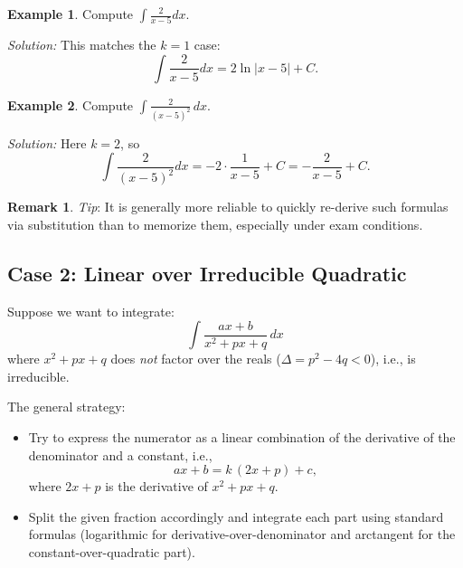 \documentclass[11pt]{article}
\theoremstyle{definition}
\newtheorem{examplex}{Example}[section]
\newtheorem*{remark}{Remark}
\theoremstyle{plain}
\begin{document}
\begin{examplex}
    Compute $\displaystyle \int \frac{2}{x-5} dx$.
    
    \emph{Solution:} This matches the \( k=1 \) case:
    \[
    \int \frac{2}{x-5} dx = 2 \ln|x-5| + C.
    \]
\end{examplex}

\begin{examplex}
    Compute $\displaystyle \int \frac{2}{(x-5)^2}\, dx$.

    \emph{Solution:} Here $k=2$, so
    \[
    \int \frac{2}{(x-5)^2} dx = -2\cdot \frac{1}{x-5} + C = -\frac{2}{x-5} + C.
    \]
\end{examplex}

\begin{remark}
    \emph{Tip}: It is generally more reliable to quickly re-derive such formulas via substitution than to memorize them, especially under exam conditions.
\end{remark}

\subsection{Case 2: Linear over Irreducible Quadratic}

Suppose we want to integrate:
\[
\int \frac{ax + b}{x^2 + px + q}\,dx
\]
where $x^2 + px + q$ does \emph{not} factor over the reals (\( \Delta = p^2 - 4q < 0 \)), i.e., is irreducible.

The general strategy:
\begin{itemize}
    \item Try to express the numerator as a linear combination of the derivative of the denominator and a constant, i.e.,
    \[
        ax + b = k\, (2x + p) + c,
    \]
    where $2x+p$ is the derivative of $x^2 + px + q$.
    \item Split the given fraction accordingly and integrate each part using standard formulas (logarithmic for derivative-over-denominator and arctangent for the constant-over-quadratic part).
\end{itemize}
\end{document}
